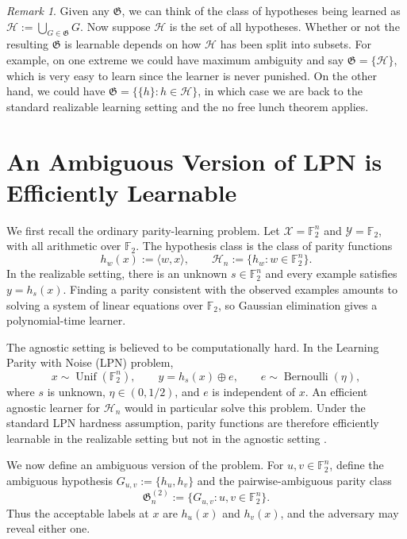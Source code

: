 \documentclass[11pt]{article}
\theoremstyle{remark}
\newtheorem{remark}[theorem]{Remark}
\begin{document}
\begin{remark}
Given any $\mathfrak{G}$, we can think of the class of hypotheses being learned as $\mathcal{H}:=\bigcup_{G\in\mathfrak{G}}G$. Now suppose $\mathcal{H}$ is the set of all hypotheses. Whether or not the resulting $\mathfrak{G}$ is learnable depends on how $\mathcal{H}$ has been split into subsets. For example, on one extreme we could have maximum ambiguity and say $\mathfrak{G}=\{\mathcal{H}\}$, which is very easy to learn since the learner is never punished. On the other hand, we could have $\mathfrak{G}=\{\{h\}:h\in\mathcal{H}\}$, in which case we are back to the standard realizable learning setting and the no free lunch theorem applies.
\end{remark}

\section{An Ambiguous Version of LPN is Efficiently Learnable}

We first recall the ordinary parity-learning problem. Let $\mathcal{X}=\mathbb{F}_2^n$ and $\mathcal{Y}=\mathbb{F}_2$, with all arithmetic over $\mathbb{F}_2$. The hypothesis class is the class of parity functions
\[
    h_w(x):=\langle w,x\rangle,
    \qquad
    \mathcal{H}_n:=\{h_w:w\in\mathbb{F}_2^n\}.
\]
In the realizable setting, there is an unknown $s\in\mathbb{F}_2^n$ and every example satisfies $y=h_s(x)$. Finding a parity consistent with the observed examples amounts to solving a system of linear equations over $\mathbb{F}_2$, so Gaussian elimination gives a polynomial-time learner.

The agnostic setting is believed to be computationally hard. In the Learning Parity with Noise (LPN) problem,
\[
    x\sim\operatorname{Unif}(\mathbb{F}_2^n),
    \qquad
    y=h_s(x)\oplus e,
    \qquad
    e\sim\operatorname{Bernoulli}(\eta),
\]
where $s$ is unknown, $\eta\in(0,1/2)$, and $e$ is independent of $x$. An efficient agnostic learner for $\mathcal{H}_n$ would in particular solve this problem. Under the standard LPN hardness assumption, parity functions are therefore efficiently learnable in the realizable setting but not in the agnostic setting \cite{blum1994cryptographic,blum2003noise}.

We now define an ambiguous version of the problem. For $u,v\in\mathbb{F}_2^n$, define the ambiguous hypothesis $G_{u,v}:=\{h_u,h_v\}$ and the pairwise-ambiguous parity class
\[
    \mathfrak{G}_n^{(2)}:=\{G_{u,v}:u,v\in\mathbb{F}_2^n\}.
\]
Thus the acceptable labels at $x$ are $h_u(x)$ and $h_v(x)$, and the adversary may reveal either one.
\end{document}
